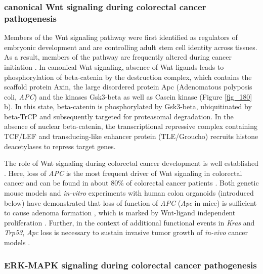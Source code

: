 \begin{flushleft}
\subsubsection{canonical Wnt signaling during colorectal cancer pathogenesis}

Members of the Wnt signaling pathway were first identified as regulators of embryonic development \parencite{sharmaEffectWinglessWg11976, nusslein-volhardMutationsAffectingSegment1980} and are controlling adult stem cell identity across tissues. As a result, members of the pathway are frequently altered during cancer initiation \parencite{zhanWntSignalingCancer2017}. In canonical Wnt signaling, absence of Wnt ligands leads to phosphorylation of beta-catenin by the destruction complex, which contains the scaffold protein Axin, the large disordered protein Apc (Adenomatous polyposis coli, \textit{APC}) and the kinases Gsk3-beta as well as Casein kinase \parencite{zhanWntSignalingCancer2017} (Figure \ref{fig_180} b). 
In this state, beta-catenin is phosphorylated by Gsk3-beta, ubiquitinated by beta-TrCP and subsequently targeted for proteasomal degradation. In the absence of nuclear beta-catenin, the transcriptional repressive complex containing TCF/LEF and transducing-like enhancer protein (TLE/Groucho) recruits histone deacetylases to repress target genes. \par 

The role of Wnt signaling during colorectal cancer development is well established \parencite{polakisManyWaysWnt2007}. Here, loss of \textit{APC} is the most frequent driver of Wnt signaling in colorectal cancer and can be found in about 80\% of colorectal cancer patients \parencite{fearonMolecularGeneticsColorectal2011, zhanWntSignalingCancer2017}. Both genetic mouse models and \textit{in-vitro} experiments with human colon organoids (introduced below) have demonstrated that loss of function of \textit{APC} (\textit{Apc} in mice) is sufficient to cause adenoma formation \parencite{moserApcMinMouseModel1995}, which is marked by Wnt-ligand independent proliferation \parencite{matanoModelingColorectalCancer2015a, drostSequentialCancerMutations2015}. Further, in the context of additional functional events in \textit{Kras} and \textit{Trp53}, \textit{Apc} loss is necessary to sustain invasive tumor growth of \textit{in-vivo} cancer models \parencite{dowApcRestorationPromotes2015a, sakaiCombinedMutationApc2018a}.
\par

\subsubsection{ERK-MAPK signaling during colorectal cancer pathogenesis}


\end{flushleft}
